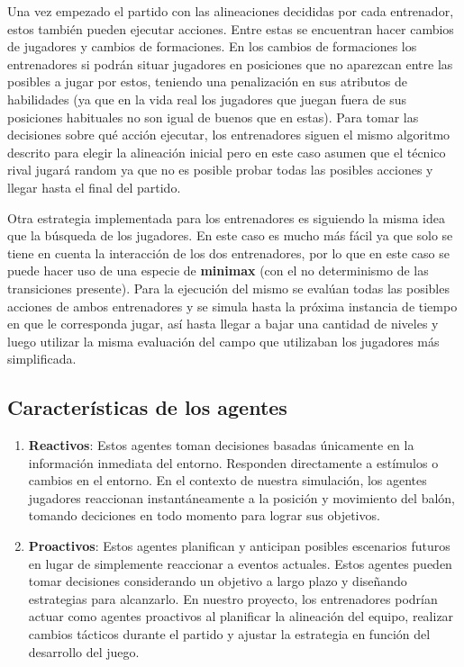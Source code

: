 \documentclass{article}
\begin{document}
Una vez empezado el partido con las alineaciones decididas por cada entrenador, estos también pueden ejecutar 
acciones. Entre estas se encuentran hacer cambios de jugadores y cambios de formaciones. En los cambios de 
formaciones los entrenadores si podrán situar jugadores en posiciones que no aparezcan entre las posibles a jugar 
por estos, teniendo una penalización en sus atributos de habilidades (ya que en la vida real los jugadores que juegan 
fuera de sus posiciones habituales no son igual de buenos que en estas). Para tomar las decisiones sobre qué acción 
ejecutar, los entrenadores siguen el mismo algoritmo descrito para elegir la alineación inicial pero en este caso 
asumen que el técnico rival jugará random ya que no es posible probar todas las posibles acciones y llegar hasta el 
final del partido.

Otra estrategia implementada para los entrenadores es siguiendo la misma idea que la búsqueda de los jugadores.
En este caso es mucho más fácil ya que solo se tiene en cuenta la interacción de los dos entrenadores, por lo que en este
caso se puede hacer uso de una especie de \textbf{minimax} (con el no determinismo de las transiciones presente). Para la ejecución del mismo
se evalúan todas las posibles acciones de ambos entrenadores y se simula hasta la próxima instancia de tiempo en que le corresponda
jugar, así hasta llegar a bajar una cantidad de niveles y luego utilizar la misma evaluación del campo que utilizaban los jugadores
más simplificada.   

\subsection{Características de los agentes}

\begin{enumerate}
      \item \textbf{Reactivos}: Estos agentes toman decisiones basadas únicamente en la información inmediata del entorno. Responden 
      directamente a estímulos o cambios en el entorno. En el contexto de nuestra simulación, los agentes jugadores reaccionan instantáneamente 
      a la posición y movimiento del balón, tomando deciciones en todo momento para lograr sus objetivos.

      \item \textbf{Proactivos}: Estos agentes planifican y anticipan posibles escenarios futuros en lugar de simplemente reaccionar a 
      eventos actuales. Estos agentes pueden tomar decisiones considerando un objetivo a largo plazo y diseñando estrategias para alcanzarlo. 
      En nuestro proyecto, los entrenadores podrían actuar como agentes proactivos al planificar la alineación del equipo, realizar cambios 
      tácticos durante el partido y ajustar la estrategia en función del desarrollo del juego.

\end{enumerate}
\end{document}
